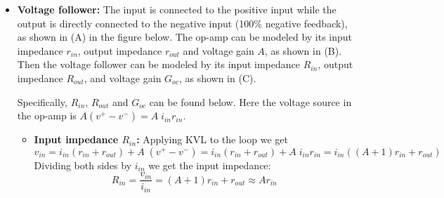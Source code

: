 \documentclass{article}
\begin{document}
\begin{itemize}

\item {\bf Voltage follower:} The input is connected to the positive 
  input while the output is directly connected to the negative input 
  (100\% negative feedback), as shown in (A) in the figure below. The 
  op-amp can be modeled by its input impedance $r_{in}$, output impedance 
  $r_{out}$ and voltage gain $A$, as shown in (B). Then the voltage follower 
  can be modeled by its input impedance $R_{in}$, output impedance $R_{out}$,
  and voltage gain $G_{oc}$, as shown in (C). 

  
  Specifically, $R_{in}$, $R_{out}$ and $G_{oc}$ can be found below. Here 
  the voltage source in the op-amp is $A(v^+-v^-)=A \;i_{in} r_{in}$.
  
  \begin{itemize}
  \item {\bf Input impedance $R_{in}$:} Applying KVL to the loop we get
    \begin{equation}
      v_{in}=i_{in}(r_{in}+r_{out})+A\;(v^+-v^-)
      =i_{in}(r_{in}+r_{out})+A\;i_{in}r_{in}
      =i_{in}((A+1)r_{in}+r_{out})
    \end{equation}
    Dividing both sides by $i_{in}$ we get the input impedance:
    \begin{equation}
      R_{in}=\frac{v_{in}}{i_{in}}=(A+1)r_{in}+r_{out} \approx Ar_{in}
    \end{equation}


\end{itemize}
\end{itemize}
\end{document}
